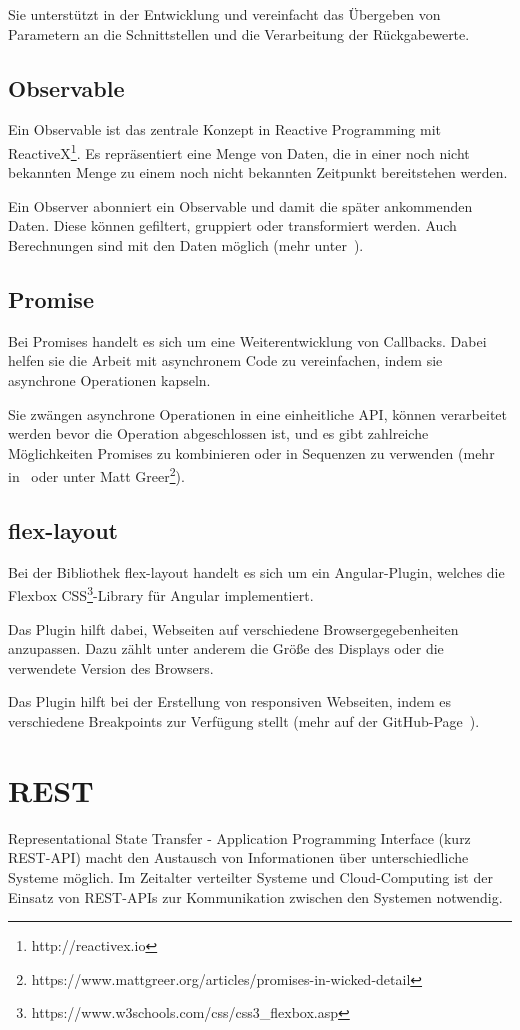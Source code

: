 Sie unterstützt in der Entwicklung und vereinfacht das Übergeben von Parametern an die Schnittstellen und die
Verarbeitung der Rückgabewerte.

\subsection{Observable}
Ein Observable ist das zentrale Konzept in Reactive Programming mit ReactiveX\footnote{http://reactivex.io}. Es
repräsentiert eine Menge von Daten, die in einer noch nicht bekannten Menge zu einem noch nicht bekannten Zeitpunkt
bereitstehen werden.

Ein Observer abonniert ein Observable und damit die später ankommenden Daten. Diese können gefiltert, gruppiert oder
transformiert werden. Auch Berechnungen sind mit den Daten möglich (mehr unter~\cite{book_grundlagen_observable}).

\subsection{Promise}
Bei Promises handelt es sich um eine Weiterentwicklung von Callbacks. Dabei helfen sie die Arbeit mit asynchronem Code
zu vereinfachen, indem sie asynchrone Operationen kapseln.

Sie zwängen asynchrone Operationen in eine einheitliche API, können verarbeitet werden bevor die Operation abgeschlossen
ist, und es gibt zahlreiche Möglichkeiten Promises zu kombinieren oder in Sequenzen zu verwenden (mehr
in~\cite{book_grundlagen_promises} oder unter Matt
Greer\footnote{https://www.mattgreer.org/articles/promises-in-wicked-detail}).

\subsection{flex-layout}
Bei der Bibliothek flex-layout handelt es sich um ein Angular-Plugin, welches die Flexbox
CSS\footnote{https://www.w3schools.com/css/css3\_flexbox.asp}-Library für Angular implementiert.

Das Plugin hilft dabei, Webseiten auf verschiedene Browsergegebenheiten anzupassen. Dazu zählt unter anderem die Größe
des Displays oder die verwendete Version des Browsers.

Das Plugin hilft bei der Erstellung von responsiven Webseiten, indem es verschiedene Breakpoints zur Verfügung stellt
(mehr auf der GitHub-Page~\cite{online_grundlagen_flexlayout}).

\section{REST}
Representational State Transfer - Application Programming Interface (kurz REST-API) macht den Austausch von
Informationen über unterschiedliche Systeme möglich. Im Zeitalter verteilter Systeme und Cloud-Computing ist der
Einsatz von REST-APIs zur Kommunikation zwischen den Systemen notwendig.

